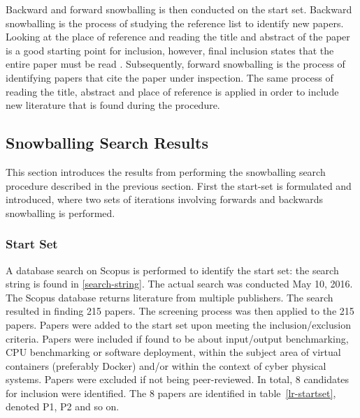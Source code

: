 Backward and forward snowballing is then conducted on the start set. Backward snowballing is the process of studying the reference list to identify new papers. Looking at the place of reference and reading the title and abstract of the paper is a good starting point for inclusion, however, final inclusion states that the entire paper must be read \cite{Wohlin}. Subsequently, forward snowballing is the process of identifying papers that cite the paper under inspection. The same process of reading the title, abstract and place of reference is applied in order to include new literature that is found during the procedure. 



\subsection{Snowballing Search Results}
This section introduces the results from performing the snowballing search procedure described in the previous section. First the start-set is formulated and introduced, where two sets of iterations involving forwards and backwards snowballing is performed. 

\subsubsection*{Start Set}
A database search on Scopus \cite{scopus} is performed to identify the start set: the search string is found in \ref{search-string}.  The actual search was conducted May 10, 2016. The Scopus database returns literature from multiple publishers. The search resulted in finding 215 papers. The screening process was then applied to the 215 papers. Papers were added to the start set upon meeting the inclusion/exclusion criteria. Papers were included if found to be about input/output benchmarking, CPU benchmarking or software deployment, within the subject area of virtual containers (preferably Docker) and/or within the context of cyber physical systems. Papers were excluded if not being peer-reviewed. In total, 8 candidates for inclusion were identified. The 8 papers are identified in table~\ref{lr-startset}, denoted P1, P2 and so on.

